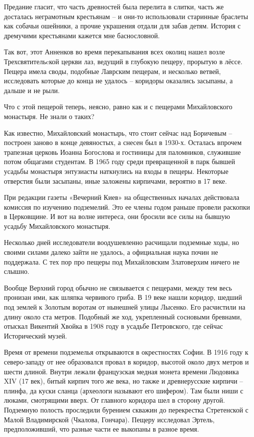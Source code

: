 Предание гласит, что часть древностей была перелита в слитки, часть же досталась неграмотным крестьянам – и они-то использовали старинные браслеты как собачьи ошейники, а прочие украшения отдали для забав детям. История с дремучими крестьянами кажется мне баснословной. 

Так вот, этот Анненков во время перекапывания всех околиц нашел возле Трехсвятительcкой церкви лаз, ведущий в глубокую пещеру, прорытую в лёссе. Пещера имела своды, подобные Лаврским пещерам, и несколько ветвей, исследовать которые до конца не удалось – коридоры оказались засыпаны, а дальше и не рыли.

Что с этой пещерой теперь, неясно, равно как и с пещерами Михайловского монастыря. Не знали о таких?

Как известно, Михайловский монастырь, что стоит сейчас над Боричевым – построен заново в конце девяностых, а снесен был в 1930-х. Осталась впрочем трапезная церковь Иоанна Богослова и гостиницы для паломников, служившие потом общагами студентам. В 1965 году среди превращенной в парк бывшей усадьбы монастыря энтузиасты наткнулись на входы в пещеры. Некоторые отверстия были засыпаны, иные заложены кирпичами, вероятно в 17 веке.

При редакции газеты «Вечерний Киев» на общественных началах действовала комиссия по изучению подземелий. Это ее члены годом раньше провели раскопки в Церковщине. И вот на волне интереса, они бросили все силы на бывшую усадьбу Михайловского монастыря.

Несколько дней исследователи воодушевленно расчищали подземные ходы, но своими силами далеко зайти не удалось, а официальная наука почин не поддержала. С тех пор про пещеры под Михайловским Златоверхим ничего не слышно.

Вообще Верхний город обычно не связывается с пещерами, между тем весь пронизан ими, как шляпка червивого гриба. В 19 веке нашли коридор, шедший под землей к Золотым воротам от нынешней улицы Лысенко. Его расчистили на длину около ста метров. Подобный же ход, укрепленный сосновыми бревнами, отыскал Викентий Хвойка в 1908 году в усадьбе Петровского, где сейчас Исторический музей.

Время от времени подземелья открываются в окрестностях Софии. В 1916 году к северо-западу от нее образовался провал в коридор, высотой около двух метров и шести длиной. Внутри лежали французская медная монета времени Людовика XIV (17 век), битый кирпич того же века, но также и древнерусские кирпичи – плинфа, да куски сланца (археологи называют его шифером). Там были ниши с люками, смотрящими вверх. От главного коридора шел в сторону другой. Подземную полость проследили бурением скважин до перекрестка Стретенской с Малой Владимирской (Чкалова, Гончара). Пещеру исследовал Эртель, предположивший, что разные части ее выкопаны в разное время. 

